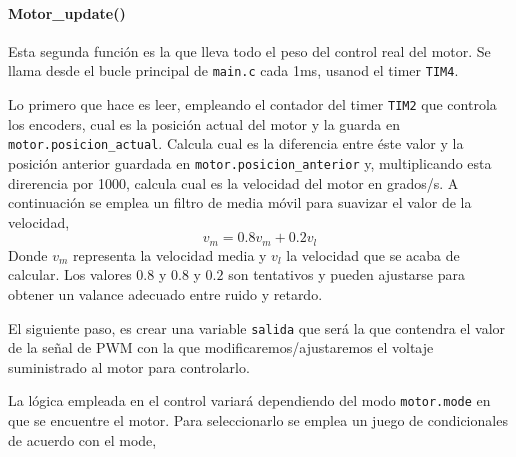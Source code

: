 \paragraph{Motor\_update()} Esta segunda función es la que lleva todo el peso del control real del motor. Se llama desde el bucle principal de \texttt{main.c} cada 1ms, usanod el timer \texttt{TIM4}.

Lo primero que hace es leer, empleando el contador del timer \texttt{TIM2} que controla los encoders, cual es la posición actual del motor y la guarda en \texttt{motor.posicion\_actual}. Calcula cual es la diferencia entre éste valor y la posición anterior guardada en \texttt{motor.posicion\_anterior} y, multiplicando esta direrencia por 1000, calcula cual es la velocidad del motor en grados/s.
A continuación se emplea un filtro de media móvil para suavizar el valor de la velocidad,
\begin{equation}
    v_m = 0.8v_m+0.2v_l
\end{equation}
Donde $v_m$ representa la velocidad media y $v_l$ la velocidad que se acaba de calcular. Los valores $0.8$ y $0.8$ y $0.2$ son tentativos y pueden ajustarse para obtener un valance adecuado entre ruido y retardo.

El siguiente paso, es crear una variable \texttt{salida} que será la que contendra el valor de la señal de PWM con la que modificaremos/ajustaremos el voltaje suministrado al motor para controlarlo.

La lógica empleada en el control variará dependiendo del modo \texttt{motor.mode} en que se encuentre el motor. Para seleccionarlo se emplea un juego de condicionales de acuerdo con el mode,

